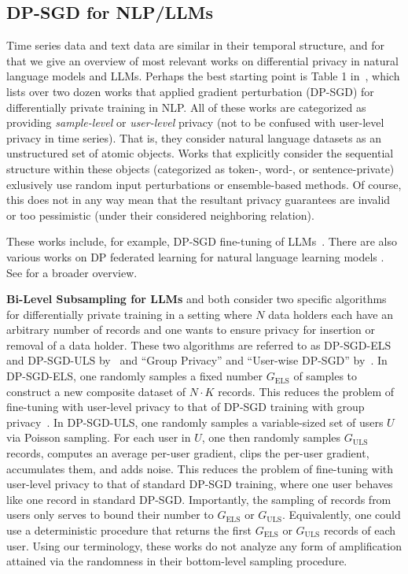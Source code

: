 \subsection{DP-SGD for NLP/LLMs}

Time series data and text data are similar in their temporal structure, and for that we give an overview of most relevant works on differential privacy in natural language models and LLMs. Perhaps the best starting point is Table 1 in~\cite{hu2024differentially}, which lists over two dozen works that applied gradient perturbation (DP-SGD) for differentially private training in NLP.
All of these works are categorized as providing \emph{sample-level} or \emph{user-level} privacy (not to be confused with user-level privacy in time series). That  is, they consider natural language datasets as an unstructured set of atomic objects.
Works that explicitly consider the sequential structure within these objects (categorized as token-, word-, or sentence-private) exlusively use random input perturbations or ensemble-based methods.
Of course, this does not in any way mean that the resultant privacy guarantees are invalid or too pessimistic (under their considered neighboring relation).

These works include, for example, DP-SGD fine-tuning of LLMs~\cite{yue2022synthetic,carranza2023synthetic,lee2023private, wunderlich2022privacy}. There are also various works on DP federated learning for natural language learning models  \cite{mcmahan2017learning, ramaswamy2020training}.  See \cite{hu2024differentially} for a broader overview. 

\textbf{Bi-Level Subsampling for LLMs}
\citet{charles2024fine} and \cite{chua2024mind} both consider two specific algorithms for differentially private training in a setting where $N$ data holders each have an arbitrary number of records and one wants to ensure privacy for insertion or removal of a data holder. 
These two algorithms are referred to as DP-SGD-ELS and DP-SGD-ULS by~\cite{charles2024fine}
and ``Group Privacy'' and ``User-wise DP-SGD'' by~\cite{chua2024mind}.
In DP-SGD-ELS, one randomly samples a fixed number $G_\mathrm{ELS}$ of samples to construct a new composite dataset of $N \cdot K$ records.
This reduces the problem of fine-tuning with user-level privacy to that of DP-SGD training with group privacy~\cite{ganesh2024tight}.
In DP-SGD-ULS, one randomly samples a variable-sized set of users $U$ via Poisson sampling.
For each user in $U$, one then randomly samples $G_\mathrm{ULS}$ records, computes an average per-user gradient, clips the per-user gradient, accumulates them, and adds noise.
This reduces the problem of fine-tuning with user-level privacy to that of standard DP-SGD training, where one user behaves like one record in standard DP-SGD.
Importantly, the sampling of records from users only serves to bound their number to $G_\mathrm{ELS}$ or $G_\mathrm{ULS}$.
Equivalently, one could use a deterministic procedure that returns the first $G_\mathrm{ELS}$ or $G_\mathrm{ULS}$ records of each user.
Using our terminology, these works do not analyze any form of amplification attained via the randomness in their bottom-level sampling procedure.

